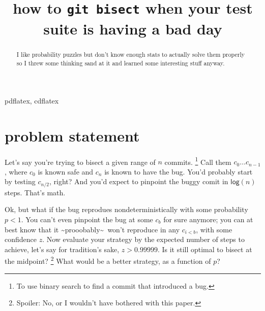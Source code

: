 \documentclass[11pt]{sigplanconf}
\begin{document}
\copyrightdata{}

\title{
how to \texttt{git bisect} when your test suite is having a bad day
}


\maketitle

\begin{abstract}
	I like probability puzzles but don't know enough stats to actually solve them properly
	so I threw some thinking sand at it and learned some interesting stuff anyway.
\end{abstract}


\keywords pdflatex, cdflatex

\newcommand\confidents{\ensuremath{z}\xspace}
\newcommand\pdf{\ensuremath{\mathsf{pdf}}\xspace}
\newcommand\cdf{\ensuremath{\mathsf{cdf}}\xspace}

\section{problem statement}

Let's say you're trying to bisect
a given range of $n$ commits.%
\footnote{To use binary search to find a commit that introduced a bug.}
Call them $c_0 \dots c_{n-1}$, where $c_0$ is known safe and $c_n$ is known to have the bug.
You'd probably start by testing $c_{n/2}$, right?
And you'd expect to pinpoint the buggy comit in $\mathsf{log} (n)$ steps.
That's math.

Ok, but what if the bug reprodues nondeterministically with some probability $p<1$.
You can't even pinpoint the bug at some $c_{b}$ for sure anymore;
you can at best know
that it \textasciitilde{}prooobably\textasciitilde~won't reproduce in any $c_{i<b}$,
with some confidence $\confidents$.
Now evaluate your strategy by the expected number of steps to achieve, let's say for tradition's sake, $\confidents > 0.99999$.
Is it still optimal to bisect at the midpoint?%
\footnote{Spoiler: No, or I wouldn't have bothered with this paper.}
What would be a better strategy, as a function of $p$?
\end{document}
